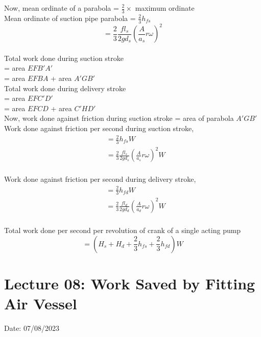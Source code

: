 \documentclass{article}
\begin{document}
\begin{multicols}{2}
      Now, mean ordinate of a parabola = $\frac{2}{3} \times $ maximum ordinate \\
      Mean ordinate of suction pipe parabola = $\frac{2}{3} h_{fs}$  $$= \frac{2}{3} \frac{f l_s}{2 g d_s} \left(\frac{A}{a_s} r \omega \right)^2$$\\ 

      Total work done during suction stroke \\= area $EFB'A'$ \\= area $EFBA$ + area $A'GB'$ \\

      Total work done during delivery stroke \\= area $EFC'D'$ \\= area $EFCD$ + area $C'HD'$ \\

      Now, work done against friction during suction stroke = area of parabola $A'GB'$\\


      Work done against friction per second during suction stroke,
      \begin{align*}
        &= \frac{2}{3} h_{fs} W \\
        &= \frac{2}{3} \frac{f l_s}{2 g d_s} \left(\frac{A}{a_s} r \omega \right)^2 W \\
      \end{align*}

      Work done against friction per second during delivery stroke,
      \begin{align*}
        &= \frac{2}{3} h_{fd} W \\
        &= \frac{2}{3} \frac{f l_d}{2 g d_d} \left(\frac{A}{a_d} r \omega \right)^2 W \\
      \end{align*}

      Total work done per second per revolution of crank of a single acting pump\\
      $$= \left( H_s + H_d + \frac{2}{3} h_{fs} + \frac{2}{3} h_{fd} \right) W $$

    \end{multicols}


    \section{Lecture 08: Work Saved by Fitting Air Vessel} 
    \hfill Date: 07/08/2023
\end{document}
